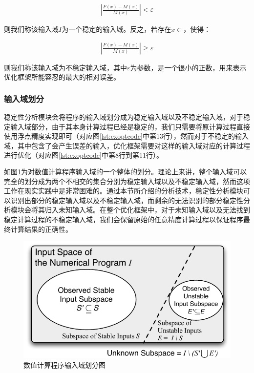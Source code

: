 \begin{align*}
  |\frac{F(x)-M(x)}{M(x)}| < \varepsilon
\end{align*}

则我们称该输入域$I$为一个稳定的输入域。反之，若存在$x \in $，使得：

\begin{align*}
  |\frac{F(x)-M(x)}{M(x)}| \geq \varepsilon
\end{align*}

则我们称该输入域为不稳定输入域，其中$\varepsilon$为参数，是一个很小的正数，用来表示优化框架所能容忍的最大的相对误差。

\subsubsection{输入域划分}

稳定性分析模块会将程序的输入域划分成为稳定输入域以及不稳定输入域，对于稳定输入域部分，由于其本身计算过程已经是稳定的，我们只需要将原计算过程直接使用浮点精度实现即可（对应图\ref{lst:exoptcode}中第13行），然而对于不稳定的输入域，其中包含了会产生误差的输入，优化框架需要对这样的输入域对应的计算过程进行优化（对应图\ref{lst:exoptcode}中第8行到第11行）。

如图\ref{fig:inputspace}为对数值计算程序输入域的一个整体的划分。理论上来讲，整个输入域可以完全的划分成为两个不相交的集合分别为稳定输入域以及不稳定输入域，然而这项工作在现实实践中是非常困难的。通过本节所介绍的分析技术，稳定性分析模块可以识别出部分的稳定输入域以及不稳定输入域，而剩余的无法识别的部分稳定性分析模块会将其归入未知输入域。在整个优化框架中，对于未知输入域以及无法找到稳定计算过程的不稳定输入域，我们会保留原始的任意精度计算过程以保证程序最终计算结果的正确性。

\begin{figure}[tb]
  \centering
  \includegraphics[width=\columnwidth]{fig/InputSpace.pdf}
  \vspace*{1mm}
  \caption{数值计算程序输入域划分图} \label{fig:inputspace} %
\end{figure}

